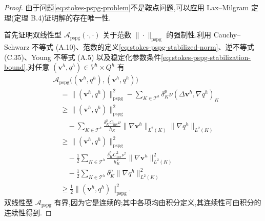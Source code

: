 \begin{proof}
由于问题\cref{eq:stokes-pspg-problem}不是鞍点问题,可以应用 Lax--Milgram 定理(定理 B.4)证明解的存在唯一性.

首先证明双线性型 $\mathcal{A}_{\mathrm{pspg}}(\cdot,\cdot)$ 关于范数 $\|\cdot\|_{\mathrm{pspg}}$ 的强制性.利用 Cauchy--Schwarz 不等式 (A.10)、范数的定义\cref{eq:stokes-pspg-stabilized-norm}、逆不等式 (C.35)、Young 不等式 (A.5) 以及稳定化参数条件\cref{eq:stokes-pspg-stabilization-bound},对任意 $(\bm{v}^h,q^h)\in V^h\times Q^h$ 有
\begin{equation}\label{eq:stokes-pspg-coercivity}
\begin{aligned}
 &\mathcal{A}_{\mathrm{pspg}}\bigl((\bm{v}^h,q^h),(\bm{v}^h,q^h)\bigr)\\
 &\quad=\| (\bm{v}^h,q^h)\|_{\mathrm{pspg}}^2
 -\sum_{K\in\mathcal{T}^h}\delta_K^p\nu
       (\Delta\bm{v}^h,\nabla q^h)_K\\
 &\quad\geq \| (\bm{v}^h,q^h)\|_{\mathrm{pspg}}^2\\
 &\qquad-\sum_{K\in\mathcal{T}^h}
       \frac{\delta_K^p C_{\mathrm{inv}}\nu}{h_K}
       \|\nabla\bm{v}^h\|_{L^2(K)}\|\nabla q^h\|_{L^2(K)}\\
 &\quad\geq \| (\bm{v}^h,q^h)\|_{\mathrm{pspg}}^2\\
 &\qquad-\frac12\sum_{K\in\mathcal{T}^h}
       \frac{\delta_K^p C_{\mathrm{inv}}^2\nu^2}{h_K^2}
       \|\nabla\bm{v}^h\|_{L^2(K)}^2\\
 &\qquad-\frac12\sum_{K\in\mathcal{T}^h}\delta_K^p
       \|\nabla q^h\|_{L^2(K)}^2\\
 &\quad\geq \frac12\| (\bm{v}^h,q^h)\|_{\mathrm{pspg}}^2.
\end{aligned}
\end{equation}
双线性型 $\mathcal{A}_{\mathrm{pspg}}$ 有界,因为它是连续的;其中各项均由积分定义,其连续性可由积分的连续性得到.


\end{proof}
